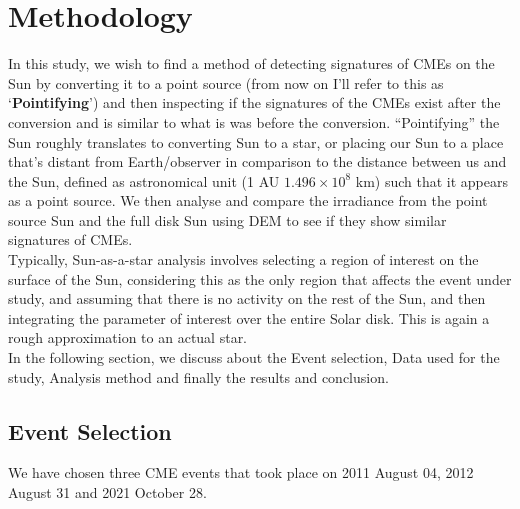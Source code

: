 \message{ !name(main.tex)}\documentclass[12pt]{article}
\begin{document}
\section{Methodology}

In this study, we wish to find a method of detecting signatures of CMEs on the Sun by converting it to a point source (from now on I'll refer to this as `\textbf{Pointifying}') and then inspecting if the signatures of the CMEs exist after the conversion and is similar to what is was before the conversion. ``Pointifying'' the Sun roughly translates to converting Sun to a star, or placing our Sun to a place that's distant from Earth/observer in comparison to the distance between us and the Sun, defined as astronomical unit (1 AU \approx $1.496\times10^{8}$ km) such that it appears as a point source. We then analyse and compare the irradiance from the point source Sun and the full disk Sun using DEM to see if they show similar signatures of CMEs.\\

Typically, Sun-as-a-star analysis involves selecting a region of interest on the surface of the Sun, considering this as the only region that affects the event under study, and assuming that there is no activity on the rest of the Sun, and then integrating the parameter of interest over the entire Solar disk. This is again a rough approximation to  an actual star.\\

In the following section, we discuss about the Event selection, Data used for the study, Analysis method and finally the results and conclusion.

\subsection{Event Selection}

We have chosen three CME events that took place on 2011 August 04, 2012 August 31 and 2021 October 28.\\
\end{document}
